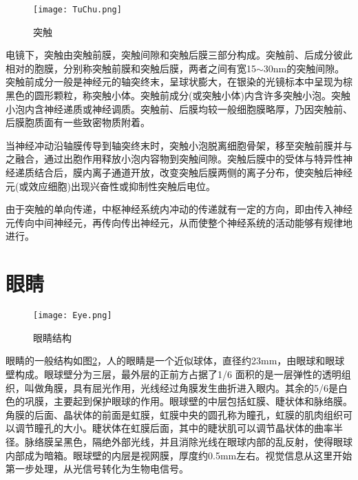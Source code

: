 \documentclass[a4paper,12pt]{article}
\begin{document}
\begin{figure}[htb]
\centering

\par \hspace{2ex}
\texttt{[image: TuChu.png]}
\caption{突触}\label{fig 3} 
\end{figure}

电镜下，突触由突触前膜，突触间隙和突触后膜三部分构成。突触前、后成分彼此相对的胞膜，分别称突触前膜和突触后膜，两者之间有宽15$\sim$30nm的突触间隙。突触前成分一般是神经元的轴突终末，呈球状膨大，在银染的光镜标本中呈现为棕黑色的圆形颗粒，称突触小体。突触前成分(或突触小体)内含许多突触小泡。突触小泡内含神经递质或神经调质。突触前、后膜均较一般细胞膜略厚，乃因突触前、后膜胞质面有一些致密物质附着。


当神经冲动沿轴膜传导到轴突终末时，突触小泡脱离细胞骨架，移至突触前膜并与之融合，通过出胞作用释放小泡内容物到突触间隙。突触后膜中的受体与特异性神经递质结合后，膜内离子通道开放，改变突触后膜两侧的离子分布，使突触后神经元(或效应细胞)出现兴奋性或抑制性突触后电位。


由于突触的单向传递，中枢神经系统内冲动的传递就有一定的方向，即由传入神经元传向中间神经元，再传向传出神经元，从而使整个神经系统的活动能够有规律地进行。


\section{眼睛}

\begin{figure}[!htb]
\centering

\par \hspace{2ex}
\texttt{[image: Eye.png]}
\caption{眼睛结构}\label{fig 4} 
\end{figure}

眼睛\cite{11:misc}的一般结构如图\ref{fig 4}，人的眼睛是一个近似球体，直径约23mm，由眼球和眼球壁构成。眼球壁分为三层，最外层的正前方占据了1/6 面积的是一层弹性的透明组织，叫做角膜，具有屈光作用，光线经过角膜发生曲折进入眼内。其余的5/6是白色的巩膜，主要起到保护眼球的作用。眼球壁的中层包括虹膜、睫状体和脉络膜。角膜的后面、晶状体的前面是虹膜，虹膜中央的圆孔称为瞳孔，虹膜的肌肉组织可以调节瞳孔的大小。睫状体在虹膜后面，其中的睫状肌可以调节晶状体的曲率半径。脉络膜呈黑色，隔绝外部光线，并且消除光线在眼球内部的乱反射，使得眼球内部成为暗箱。眼球壁的内层是视网膜，厚度约0.5mm左右。视觉信息从这里开始第一步处理，从光信号转化为生物电信号\cite{16:book}。
\end{document}
